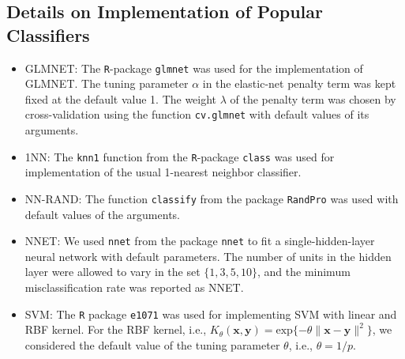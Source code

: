 \documentclass[twoside]{article}
\newcommand{\bx}{\mathbf{x}}
\newcommand{\by}{\mathbf{y}}
\newcommand{\0}{\mathbf{0}}
\newcommand{\1}{\mathbf{1}}
\numberwithin{equation}{section}
\begin{document}
\subsection{Details on Implementation of Popular Classifiers}\label{popdet}
\begin{itemize}
 \item GLMNET: The {\tt R}-package {\tt glmnet} was used for the implementation of GLMNET. The tuning parameter $\alpha$ in the elastic-net penalty term was kept fixed at the default value 1. The weight $\lambda$ of the penalty term was chosen by cross-validation using the function {\tt cv.glmnet} with default values of its arguments.
 \item 1NN: The {\tt knn1} function from the {\tt R}-package {\tt class} was used for implementation of the usual 1-nearest neighbor classifier.
 \item NN-RAND: The function {\tt classify} from the package {\tt RandPro} was used with default values of the arguments.
 \item NNET: We used {\tt nnet} from the package {\tt nnet} to fit a single-hidden-layer neural network with default parameters. The number of units in the hidden layer were allowed to vary in the set $\{1,3,5,10\}$, and the minimum misclassification rate was reported as NNET.
 \item SVM: The {\tt R} package {\tt e1071} was used for implementing SVM with linear and RBF kernel. For the RBF kernel, i.e., $K_\theta(\bx,\by)=\mathrm{exp}\{-\theta\|\bx-\by\|^2\}$, we considered the default value of the tuning parameter $\theta$, i.e., $\theta=1/p$.
\end{itemize}
\end{document}
